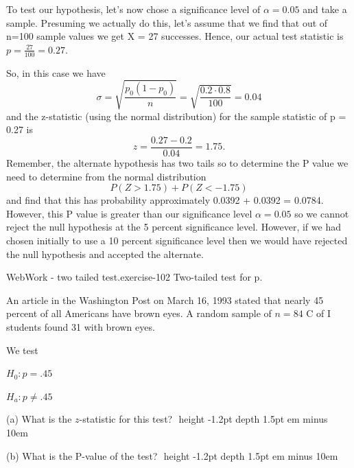 \documentclass[10pt,]{book}
\newcommand{\fillin}[1]{\leavevmode\leaders\vrule height -1.2pt depth 1.5pt \hskip #1em minus #1em \null}
\numberwithin{equation}{section}
\newcommand{\lt}{<}
\newcommand{\gt}{>}
\begin{document}
\par
\hypertarget{p-1454}{}%
To test our hypothesis, let's now chose a significance level of \(\alpha = 0.05\) and take a sample. Presuming we actually do this, let's assume that we find that out of n=100 sample values we get X = 27 successes. Hence, our actual test statistic is \(p = \frac{27}{100} = 0.27\).%
\par
\hypertarget{p-1455}{}%
So, in this case we have%
\begin{equation*}
\sigma = \sqrt{\frac{p_0(1-p_0)}{n}} = \sqrt{\frac{0.2 \cdot 0.8}{100}} = 0.04
\end{equation*}
and the z-statistic (using the normal distribution) for the sample statistic of p = 0.27 is%
\begin{equation*}
z = \frac{0.27 - 0.2}{0.04} = 1.75.
\end{equation*}
Remember, the alternate hypothesis has two tails so to determine the P value we need to determine from the normal distribution%
\begin{equation*}
P(Z \gt 1.75) + P(Z \lt -1.75)
\end{equation*}
and find that this has probability approximately 0.0392 + 0.0392 = 0.0784.  However, this P value is greater than our significance level \(\alpha = 0.05\) so we cannot reject the null hypothesis at the 5 percent significance level. However, if we had chosen initially to use a 10 percent significance level then we would have rejected the null hypothesis and accepted the alternate.%
\par
\hypertarget{p-1456}{}%
\begin{inlineexercise}{WebWork - two tailed test.}{exercise-102}%
\hypertarget{p-1457}{}%
Two-tailed test for p.%
\par\medskip
\hypertarget{p-1458}{}%
An article in the Washington Post on March 16, 1993 stated that nearly 45 percent of  all Americans have brown eyes.  A random sample of \(n = 
84\) C of I students found 31 with brown eyes.%
\par
\hypertarget{p-1459}{}%
We test%
\par
\hypertarget{p-1460}{}%
\(H_0: p = .45\)%
\par
\hypertarget{p-1461}{}%
\(H_a: p \neq .45\)%
\par
\hypertarget{p-1462}{}%
(a) What is the \(z\)-statistic for this test? \(\)  \fillin{10}%
\par
\hypertarget{p-1463}{}%
(b) What is the P-value of the test?  \(\)  \fillin{10}%
\end{inlineexercise}
\end{document}
